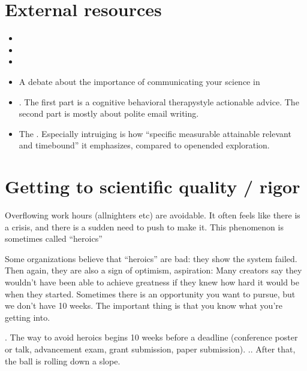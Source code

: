 \documentclass[letterpaper,10pt,english]{sphinxmanual}
\begin{document}
\section{External resources}
\label{\detokenize{02Elements:external-resources}}\begin{itemize}
\item {} 
\sphinxAtStartPar
{}

\item {} 
\sphinxAtStartPar
{}

\item {} 
\sphinxAtStartPar
{}

\item {} 
\sphinxAtStartPar
A debate about the importance of communicating your science in 

\item {} 
\sphinxAtStartPar
{}. The first part is a cognitive behavioral therapy\sphinxhyphen{}style actionable advice. The second part is mostly about polite e\sphinxhyphen{}mail writing.

\item {} 
\sphinxAtStartPar
The . Especially intruiging is how “specific measurable attainable relevant and time\sphinxhyphen{}bound” it emphasizes, compared to open\sphinxhyphen{}ended exploration.

\end{itemize}


\section{Getting to scientific quality / rigor}
\label{\detokenize{02Elements:getting-to-scientific-quality-rigor}}
\sphinxAtStartPar
Overflowing work hours (all\sphinxhyphen{}nighters etc) are avoidable.
It often feels like there is a crisis, and there is a sudden need to push to make it.
This phenomenon is sometimes called “heroics” %
\begin{footnote}[1]\sphinxAtStartFootnote
Some organizations believe that “heroics” are bad: they show the system failed. Then again, they are also a sign of optimism, aspiration: Many creators say they wouldn’t have been able to achieve greatness if they knew how hard it would be when they started. Sometimes there is an opportunity you want to pursue, but we don’t have 10 weeks. The important thing is that you know what you’re getting into.
%
\end{footnote} .
The way to avoid heroics begins 10 weeks before a deadline (conference poster or talk, advancement exam, grant submission, paper submission).
.. After that, the ball is rolling down a slope.
\end{document}
